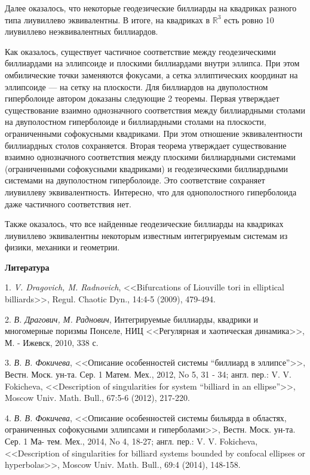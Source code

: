 Далее оказалось, что некоторые геодезические биллиарды на квадриках разного типа лиувиллево эквивалентны.
В итоге, на квадриках в $\mathbb{R}^3$ есть ровно 10 лиувиллево неэквивалентных биллиардов.



Как оказалось, существует частичное соответствие между геодезическими биллиардами на эллипсоиде и плоскими биллиардами
внутри эллипса. При этом омбилические точки заменяются фокусами, а сетка эллиптических координат на
эллипсоиде --- на сетку на плоскости. Для биллиардов на двуполостном гиперболоиде
автором доказаны следующие 2 теоремы. Первая утверждает существование взаимно однозначного соответствия между
биллиардными столами на двуполостном гиперболоиде и биллиардными столами на плоскости, ограниченными софокусными квадриками. При этом
отношение эквивалентности биллиардных столов сохраняется. Вторая теорема утверждает существование
взаимно однозначного соответствия между плоскими биллиардными системами (ограниченными софокусными квадриками) и геодезическими биллиардными
системами на
двуполостном гиперболоиде. Это соответствие сохраняет лиувиллеву эквивалентность.
Интересно, что для однополостного гиперболоида даже частичного соответствия нет.

Также оказалось, что все найденные геодезические биллиарды на квадриках лиувиллево эквивалентны некоторым известным
интегрируемым системам из физики, механики и геометрии.


\smallskip \centerline {\bf Литература} \nopagebreak


1. {\it V. Dragovich, M. Radnovich}, <<Bifurcations of Liouville tori in elliptical billiards>>, Regul.
Chaotic Dyn., 14:4-5 (2009), 479-494.

2. {\it В. Драгович, М. Раднович}, Интегрируемые биллиарды, квадрики и многомерные
поризмы Понселе, НИЦ <<Регулярная и хаотическая динамика>>, М. - Ижевск, 2010,
338 с.

3. {\it В. В. Фокичева}, <<Описание особенностей системы ``биллиард в эллипсе''>>, Вестн.
Моск. ун-та. Сер. 1 Матем. Мех., 2012, No 5, 31 - 34; англ. пер.: V. V. Fokicheva,
<<Description of singularities for system ``billiard in an ellipse''>>, Moscow Univ. Math.
Bull., 67:5-6 (2012), 217-220.

4. {\it В. В. Фокичева}, <<Описание особенностей системы бильярда в областях, ограниченных
софокусными эллипсами и гиперболами>>, Вестн. Моск. ун-та. Сер. 1 Ма-
тем. Мех., 2014, No 4, 18-27; англ. пер.: V. V. Fokicheva, <<Description of singularities
for billiard systems bounded by confocal ellipses or hyperbolas>>, Moscow Univ. Math.
Bull., 69:4 (2014), 148-158.
